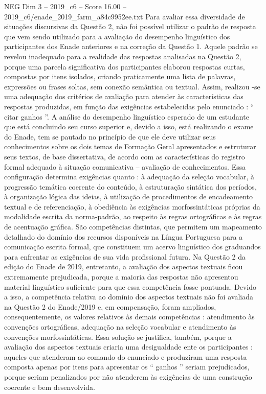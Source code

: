 \begin{textsample}{NEG Dim 3 – 2019\_c6 – Score 16.00 – 2019\_c6/enade\_2019\_farm\_a84c9952ee.txt}
Para avaliar essa diversidade de situações discursivas da Questão 2, não foi possível utilizar o padrão de resposta que vem sendo utilizado para a avaliação do desempenho linguístico dos participantes dos Enade anteriores e na correção da Questão 1.
Aquele padrão se revelou inadequado para a realidade das respostas analisadas na Questão 2, porque uma parcela significativa dos participantes elaborou respostas curtas, compostas por itens isolados, criando praticamente uma lista de palavras, expressões ou frases soltas, sem conexão semântica ou textual.
Assim, realizou -se uma adequação dos critérios de avaliação para atender às características das respostas produzidas, em função das exigências estabelecidas pelo enunciado : “ citar ganhos ”.
A análise do desempenho linguístico esperado de um estudante que está concluindo seu curso superior e, devido a isso, está realizando o exame do Enade, tem se pautado no princípio de que ele deve utilizar seus conhecimentos sobre os dois temas de Formação Geral apresentados e estruturar seus textos, de base dissertativa, de acordo com as características do registro formal adequado à situação comunicativa – avaliação de conhecimentos.
Essa configuração determina exigências quanto : à adequação da seleção vocabular, à progressão temática coerente do conteúdo, à estruturação sintática dos períodos, à organização lógica das ideias, à utilização de procedimentos de encadeamento textual e de referenciação, à obediência às exigências morfossintáticas próprias da modalidade escrita da norma-padrão, ao respeito às regras ortográficas e às regras de acentuação gráfica.
São competências distintas, que permitem um mapeamento detalhado do domínio dos recursos disponíveis na Língua Portuguesa para a comunicação escrita formal, que constituem um acervo linguístico dos graduandos para enfrentar as exigências de sua vida profissional futura.
Na Questão 2 da edição do Enade de 2019, entretanto, a avaliação dos aspectos textuais ficou extremamente prejudicada, porque a maioria das respostas não apresentou material linguístico suficiente para que essa competência fosse pontuada.
Devido a isso, a competência relativa ao domínio dos aspectos textuais não foi avaliada na Questão 2 do Enade/2019 e, em compensação, foram ampliados, consequentemente, os valores relativos às demais competências : atendimento às convenções ortográficas, adequação na seleção vocabular e atendimento às convenções morfossintáticas.
Essa solução se justifica, também, porque a avaliação dos aspectos textuais criaria uma desigualdade ente os participantes : aqueles que atenderam ao comando do enunciado e produziram uma resposta composta apenas por itens para apresentar os “ ganhos ” seriam prejudicados, porque seriam penalizados por não atenderem às exigências de uma construção coerente e bem desenvolvida.

\end{textsample}
